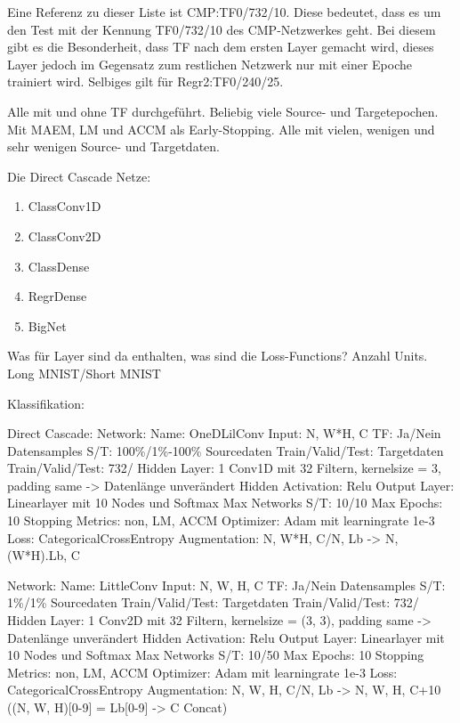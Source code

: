 Eine Referenz zu dieser Liste ist CMP:TF0/732/10. Diese bedeutet, dass es um den Test mit der Kennung TF0/732/10 des CMP-Netzwerkes geht. 
Bei diesem gibt es die Besonderheit, dass TF nach dem ersten Layer gemacht wird, dieses Layer jedoch im 
Gegensatz zum restlichen Netzwerk nur mit einer Epoche trainiert wird.
Selbiges gilt für Regr2:TF0/240/25.


\iffalse
Alle mit und ohne TF durchgeführt. Beliebig viele Source- und Targetepochen. Mit MAEM, LM und ACCM als Early-Stopping. 
Alle mit vielen, wenigen und sehr wenigen Source- und Targetdaten. 

Die Direct Cascade Netze: 
\begin{enumerate}
    \item ClassConv1D
    \item ClassConv2D
    \item ClassDense
    \item RegrDense
    \item BigNet
\end{enumerate}

Was für Layer sind da enthalten, was sind die Loss-Functions? Anzahl Units. Long MNIST/Short MNIST

Klassifikation: 

Direct Cascade:
Network: 
Name: OneDLilConv
Input: N, W*H, C
TF: Ja/Nein
Datensamples S/T: 100\%/1\%-100\%
Sourcedaten Train/Valid/Test: 
Targetdaten Train/Valid/Test: 732/
Hidden Layer: 1 Conv1D mit 32 Filtern, kernelsize = 3, padding same -> Datenlänge unverändert
Hidden Activation: Relu
Output Layer: Linearlayer mit 10 Nodes und Softmax
Max Networks S/T: 10/10
Max Epochs: 10
Stopping Metrics: non, LM, ACCM
Optimizer: Adam mit learningrate 1e-3
Loss: CategoricalCrossEntropy
Augmentation: N, W*H, C/N, Lb -> N, (W*H).Lb, C  %


Network: 
Name: LittleConv
Input: N, W, H, C
TF: Ja/Nein
Datensamples S/T: 1\%/1\%
Sourcedaten Train/Valid/Test: 
Targetdaten Train/Valid/Test: 732/
Hidden Layer: 1 Conv2D mit 32 Filtern, kernelsize = (3, 3), padding same -> Datenlänge unverändert
Hidden Activation: Relu
Output Layer: Linearlayer mit 10 Nodes und Softmax
Max Networks S/T: 10/50
Max Epochs: 10
Stopping Metrics: non, LM, ACCM
Optimizer: Adam mit learningrate 1e-3
Loss: CategoricalCrossEntropy
Augmentation: N, W, H, C/N, Lb -> N, W, H, C+10 ((N, W, H)[0-9] = Lb[0-9] -> C Concat)


